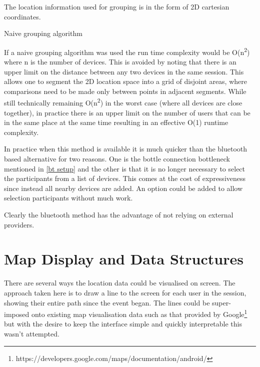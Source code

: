 The location information used for grouping is in the form of 2D cartesian coordinates.

\begin{algorithm}
\caption{Naive grouping algorithm}
\end{algorithm}

If a naive grouping algorithm was used the run time complexity would be O(n\textsuperscript{2}) where n is the number of devices.
This is avoided by noting that there is an upper limit on the distance between any two devices in the same session. This allows one to segment the 2D location space into a grid of disjoint areas, where comparisons need to be made only between points in adjacent segments. While still technically remaining O(n\textsuperscript{2}) in the worst case (where all devices are close together), in practice there is an upper limit on the number of users that can be in the same place at the same time resulting in an effective O(1) runtime complexity.

In practice when this method is available it is much quicker than the bluetooth based alternative for two reasons. One is the bottle connection bottleneck mentioned in \ref{bt setup} and the other is that it is no longer necessary to select the participants from a list of devices. This comes at the cost of expressiveness since instead all nearby devices are added. An option could be added to allow selection participants without much work.

Clearly the bluetooth method has the advantage of not relying on external providers.

\section{Map Display and Data Structures}

There are several ways the location data could be visualised on screen. The approach taken here is to draw a line to the screen for each user in the session, showing their entire path since the event began. The lines could be super-imposed onto existing map visualisation data such as that provided by Google\footnote{https://developers.google.com/maps/documentation/android/} but with the desire to keep the interface simple and quickly interpretable this wasn't attempted.

